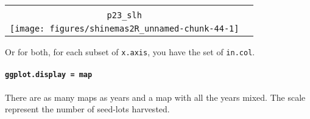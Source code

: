 \documentclass{article}\usepackage[]{graphicx}\usepackage[]{color}
\newenvironment{knitrout}{}{} %
\begin{document}
\begin{itemize}
\begin{center}
\begin{tabular}{cc}
\begin{knitrout}
{}



\end{knitrout}
\\
\texttt{p23\_slh} & \\
\begin{knitrout}
\definecolor{shadecolor}{rgb}{0.969, 0.969, 0.969}\color{fgcolor}

{\centering \texttt{[image: figures/shinemas2R\_unnamed-chunk-44-1]} 

}



\end{knitrout}
&
\\
\end{tabular}
\end{center}


Or for both, for each subset of \texttt{x.axis}, you have the set of \texttt{in.col}.

\end{itemize}


\paragraph{\texttt{ggplot.display = map}}

There are as many maps as years and a map with all the years mixed.
The scale represent the number of seed-lots harvested.
\end{document}
